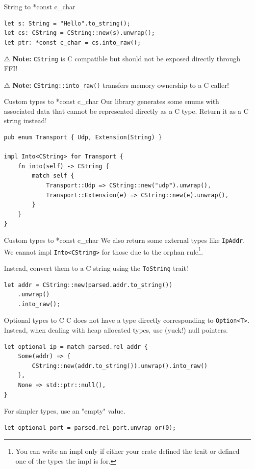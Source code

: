 \documentclass[aspectratio=1610,14pt,t]{beamer}
\begin{document}
\begin{frame}[c,fragile]{String to *const c\_char}
  \begin{verbatim}
let s: String = "Hello".to_string();
let cs: CString = CString::new(s).unwrap();
let ptr: *const c_char = cs.into_raw();
  \end{verbatim}

  ⚠ \textbf{Note:} \texttt{CString} is C compatible but should not be exposed
  directly through FFI!

  ⚠ \textbf{Note:} \texttt{CString::into\_raw()} transfers memory ownership to a
  C caller!
\end{frame}

\begin{frame}[c,fragile]{Custom types to *const c\_char}
  Our library generates some enums with associated data that cannot be
  represented directly as a C type. Return it as a C string instead!

  \begin{verbatim}
pub enum Transport { Udp, Extension(String) }

impl Into<CString> for Transport {
    fn into(self) -> CString {
        match self {
            Transport::Udp => CString::new("udp").unwrap(),
            Transport::Extension(e) => CString::new(e).unwrap(),
        }
    }
}
  \end{verbatim}
\end{frame}

\begin{frame}[c,fragile]{Custom types to *const c\_char}
  We also return some external types like \texttt{IpAddr}. We cannot impl
  \texttt{Into<CString>} for those due to the orphan rule\footnote{You can write
  an impl only if either your crate defined the trait or defined one of the
  types the impl is for.}.

  Instead, convert them to a C string using the \texttt{ToString} trait!

  \begin{verbatim}
let addr = CString::new(parsed.addr.to_string())
    .unwrap()
    .into_raw();
  \end{verbatim}
\end{frame}

\begin{frame}[c,fragile]{Optional types to C}
  C does not have a type directly corresponding to \texttt{Option<T>}. Instead,
  when dealing with heap allocated types, use (yuck!) null pointers.

  \begin{verbatim}
let optional_ip = match parsed.rel_addr {
    Some(addr) => {
        CString::new(addr.to_string()).unwrap().into_raw()
    },
    None => std::ptr::null(),
}
  \end{verbatim}

  \pause

  For simpler types, use an "empty" value.

  \begin{verbatim}
let optional_port = parsed.rel_port.unwrap_or(0);
  \end{verbatim}
\end{frame}
\end{document}
